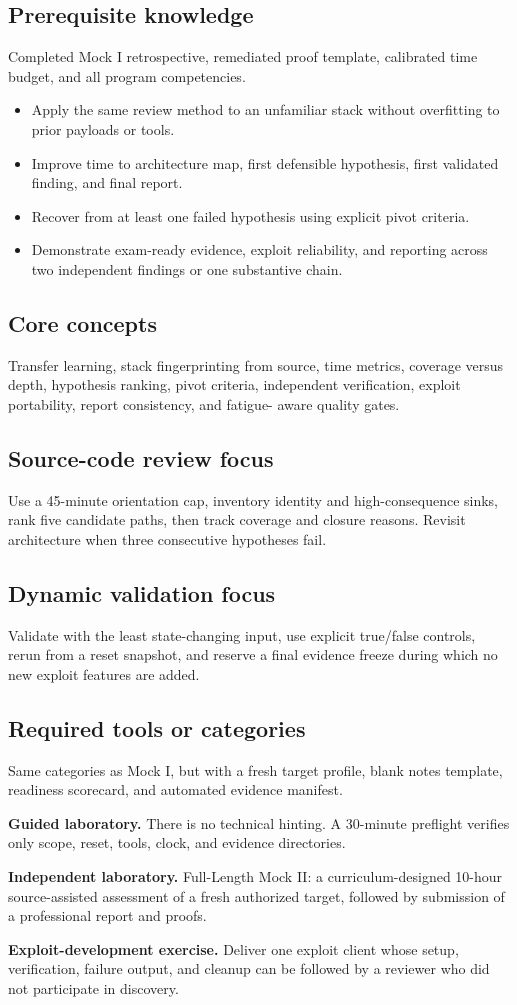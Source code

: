 \documentclass[11pt]{article}
\newcommand{\weekfield}[2]{%
  \Needspace{5\baselineskip}
  \subsection*{#1}
  #2
}
\begin{document}
\weekfield{Prerequisite knowledge}{Completed Mock I retrospective, remediated
proof template, calibrated time budget, and all program competencies.}

\begin{objectivebox}
\begin{itemize}
  \item Apply the same review method to an unfamiliar stack without overfitting to prior payloads or tools.
  \item Improve time to architecture map, first defensible hypothesis, first validated finding, and final report.
  \item Recover from at least one failed hypothesis using explicit pivot criteria.
  \item Demonstrate exam-ready evidence, exploit reliability, and reporting across two independent findings or one substantive chain.
\end{itemize}
\end{objectivebox}

\weekfield{Core concepts}{Transfer learning, stack fingerprinting from source,
time metrics, coverage versus depth, hypothesis ranking, pivot criteria,
independent verification, exploit portability, report consistency, and fatigue-
aware quality gates.}

\weekfield{Source-code review focus}{Use a 45-minute orientation cap, inventory
identity and high-consequence sinks, rank five candidate paths, then track coverage
and closure reasons. Revisit architecture when three consecutive hypotheses fail.}

\weekfield{Dynamic validation focus}{Validate with the least state-changing input,
use explicit true/false controls, rerun from a reset snapshot, and reserve a final
evidence freeze during which no new exploit features are added.}

\weekfield{Required tools or categories}{Same categories as Mock I, but with a
fresh target profile, blank notes template, readiness scorecard, and automated
evidence manifest.}

\begin{labbox}
\textbf{Guided laboratory.} There is no technical hinting. A 30-minute preflight
verifies only scope, reset, tools, clock, and evidence directories.

\textbf{Independent laboratory.} Full-Length Mock II: a curriculum-designed
10-hour source-assisted assessment of a fresh authorized target, followed by
submission of a professional report and proofs.

\textbf{Exploit-development exercise.} Deliver one exploit client whose setup,
verification, failure output, and cleanup can be followed by a reviewer who did
not participate in discovery.
\end{labbox}
\end{document}
